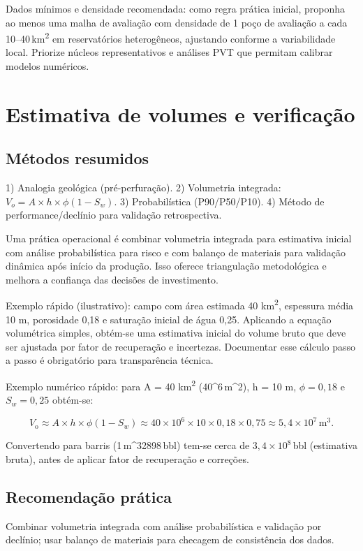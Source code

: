 \documentclass[
  12pt,
  a4paper,
  oneside,
  brazilian,
  sumario=tradicional
]{abntex2}
\begin{document}
 Dados mínimos e densidade recomendada: como regra prática inicial, proponha ao menos
 uma malha de avaliação com densidade de 1 poço de avaliação a cada 10--40\,km\textsuperscript{2}
 em reservatórios heterogêneos, ajustando conforme a variabilidade local. Priorize
 núcleos representativos e análises PVT que permitam calibrar modelos numéricos.

\chapter{Estimativa de volumes e verificação}
\section{Métodos resumidos}
1) Analogia geológica (pré-perfuração). 2) Volumetria integrada: $V_o = A\times h\times \phi(1-S_w)$. 3) Probabilística (P90/P50/P10). 4) Método de performance/declínio para
validação retrospectiva.

Uma prática operacional é combinar volumetria integrada para estimativa inicial
com análise probabilística para risco e com balanço de materiais para validação
dinâmica após início da produção. Isso oferece triangulação metodológica e
melhora a confiança das decisões de investimento.

Exemplo rápido (ilustrativo): campo com área estimada 40 km\textsuperscript{2},
espessura média 10 m, porosidade 0{,}18 e saturação inicial de água 0{,}25.
Aplicando a equação volumétrica simples, obtém-se uma estimativa inicial do
volume bruto que deve ser ajustada por fator de recuperação e incertezas.
Documentar esse cálculo passo a passo é obrigatório para transparência técnica.

Exemplo numérico rápido: para A = 40 km\textsuperscript{2} (40^{6}\,m^{2}), h = 10 m, $\phi=0{,}18$ e $S_{w}=0{,}25$ obtém-se:

\[V_{\mathrm{o}} \approx A\times h\times \phi(1-S_{w})
  \approx 40\times10^{6}\times10\times0{,}18\times0{,}75
  \approx 5{,}4\times10^{7}\,\mathrm{m}^{3}.
\]

Convertendo para barris (1\,m^{3}2898\,bbl) tem-se cerca de $3{,}4\times10^{8}$\,bbl (estimativa bruta), antes de aplicar fator de recuperação e correções.

\section{Recomendação prática}
Combinar volumetria integrada com análise probabilística e validação por
declínio; usar balanço de materiais para checagem de consistência dos dados.
\end{document}
